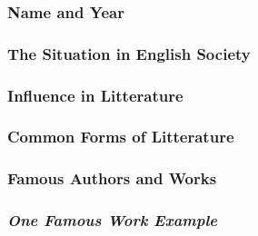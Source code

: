 \subsubsection{Name and Year}

\subsubsection{The Situation in English Society}

\subsubsection{Influence in Litterature}

\subsubsection{Common Forms of Litterature}

\subsubsection{Famous Authors and Works}

\subsubsection{\textit{One Famous Work Example}}









